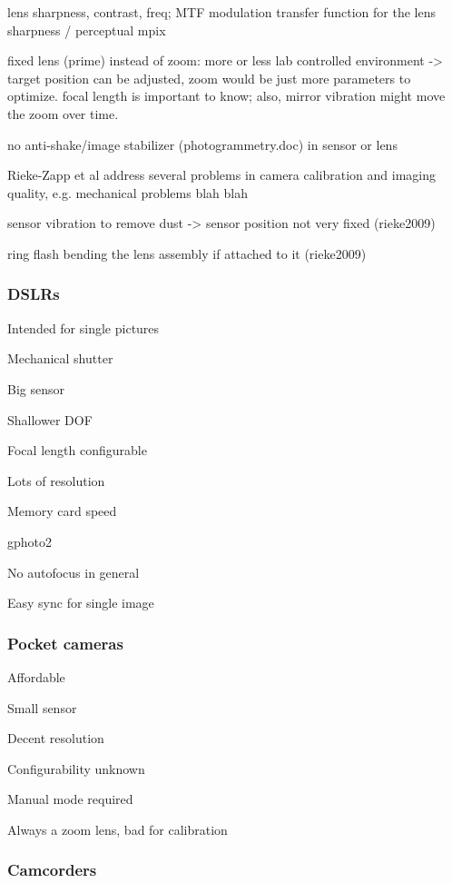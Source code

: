 
lens sharpness, contrast, freq; MTF modulation transfer function for the lens sharpness / perceptual mpix

fixed lens (prime) instead of zoom: more or less lab controlled environment -> target position can be adjusted, zoom would be just more parameters to optimize. focal length is important to know; also, mirror vibration might move the zoom over time.

no anti-shake/image stabilizer  (photogrammetry.doc) in sensor or lens

Rieke-Zapp et al \cite{rieke2009evaluation} address several problems in camera calibration and imaging quality, e.g. mechanical problems blah blah

sensor vibration to remove dust -> sensor position not very fixed (rieke2009)

ring flash bending the lens assembly if attached to it (rieke2009)

\subsubsection{DSLRs}

Intended for single pictures

Mechanical shutter

Big sensor

Shallower DOF

Focal length configurable

Lots of resolution

Memory card speed

gphoto2

No autofocus in general

Easy sync for single image

\subsubsection{Pocket cameras}

Affordable

Small sensor

Decent resolution

Configurability unknown

Manual mode required

Always a zoom lens, bad for calibration


\subsubsection{Camcorders}

